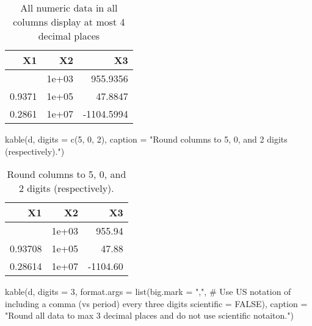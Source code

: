 \documentclass[
  letterpaper,
  DIV=11,
  numbers=noendperiod]{scrartcl}
\newenvironment{Shaded}{\begin{snugshade}}{\end{snugshade}}
\newcommand{\AttributeTok}[1]{\textcolor[rgb]{0.40,0.45,0.13}{#1}}
\newcommand{\CommentTok}[1]{\textcolor[rgb]{0.37,0.37,0.37}{#1}}
\newcommand{\ConstantTok}[1]{\textcolor[rgb]{0.56,0.35,0.01}{#1}}
\newcommand{\DecValTok}[1]{\textcolor[rgb]{0.68,0.00,0.00}{#1}}
\newcommand{\FunctionTok}[1]{\textcolor[rgb]{0.28,0.35,0.67}{#1}}
\newcommand{\NormalTok}[1]{\textcolor[rgb]{0.00,0.23,0.31}{#1}}
\newcommand{\StringTok}[1]{\textcolor[rgb]{0.13,0.47,0.30}{#1}}
\begin{document}
\begin{longtable}[]{@{}rrr@{}}

\caption{\label{tbl-column-formats1}All numeric data in all columns
display at most 4 decimal places}

\tabularnewline

\toprule\noalign{}
X1 & X2 & X3 \\
\midrule\noalign{}
\endhead
\bottomrule\noalign{}
\endlastfoot
0.9148 & 1e+03 & 955.9356 \\
0.9371 & 1e+05 & 47.8847 \\
0.2861 & 1e+07 & -1104.5994 \\

\end{longtable}

\begin{Shaded}
\begin{Highlighting}[]
\FunctionTok{kable}\NormalTok{(d, }\AttributeTok{digits =} \FunctionTok{c}\NormalTok{(}\DecValTok{5}\NormalTok{, }\DecValTok{0}\NormalTok{, }\DecValTok{2}\NormalTok{),}
      \AttributeTok{caption =} \StringTok{"Round columns to 5, 0, and 2 digits (respectively)."}\NormalTok{)}
\end{Highlighting}
\end{Shaded}

\begin{longtable}[]{@{}rrr@{}}

\caption{\label{tbl-column-formats2}Round columns to 5, 0, and 2 digits
(respectively).}

\tabularnewline

\toprule\noalign{}
X1 & X2 & X3 \\
\midrule\noalign{}
\endhead
\bottomrule\noalign{}
\endlastfoot
0.91481 & 1e+03 & 955.94 \\
0.93708 & 1e+05 & 47.88 \\
0.28614 & 1e+07 & -1104.60 \\

\end{longtable}

\begin{Shaded}
\begin{Highlighting}[]
\FunctionTok{kable}\NormalTok{(d, }\AttributeTok{digits =} \DecValTok{3}\NormalTok{, }
      \AttributeTok{format.args =} \FunctionTok{list}\NormalTok{(}\AttributeTok{big.mark =} \StringTok{","}\NormalTok{, }\CommentTok{\# Use US notation of including a comma (vs period) every three digits}
                         \AttributeTok{scientific =} \ConstantTok{FALSE}\NormalTok{),}
      \AttributeTok{caption =} \StringTok{"Round all data to max 3 decimal places and do not use scientific notaiton."}\NormalTok{)}
\end{Highlighting}
\end{Shaded}
\end{document}
